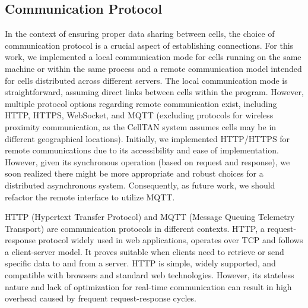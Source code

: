 

\subsection{Communication Protocol}

In the context of ensuring proper data sharing between cells, the choice of communication protocol is a crucial aspect of establishing connections. For this work, we implemented a local communication mode for cells running on the same machine or within the same process and a remote communication model intended for cells distributed across different servers. The local communication mode is straightforward, assuming direct links between cells within the program. However, multiple protocol options regarding remote communication exist, including HTTP, HTTPS, WebSocket, and MQTT (excluding protocols for wireless proximity communication, as the CellTAN system assumes cells may be in different geographical locations). Initially, we implemented HTTP/HTTPS for remote communications due to its accessibility and ease of implementation. However, given its synchronous operation (based on request and response), we soon realized there might be more appropriate and robust choices for a distributed asynchronous system. Consequently, as future work, we should refactor the remote interface to utilize MQTT.

HTTP (Hypertext Transfer Protocol) and MQTT (Message Queuing Telemetry Transport) are communication protocols in different contexts. HTTP, a request-response protocol widely used in web applications, operates over TCP and follows a client-server model. It proves suitable when clients need to retrieve or send specific data to and from a server. HTTP is simple, widely supported, and compatible with browsers and standard web technologies. However, its stateless nature and lack of optimization for real-time communication can result in high overhead caused by frequent request-response cycles.


